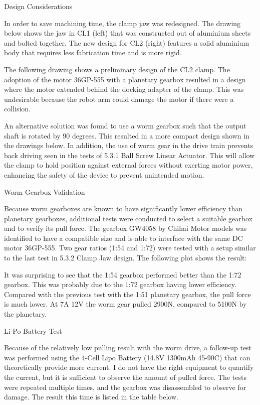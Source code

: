 Design Considerations

In order to save machining time, the clamp jaw was redesigned. The drawing below shows the jaw in CL1 (left) that was constructed out of aluminium sheets and bolted together. The new design for CL2 (right) features a solid aluminium body that requires less fabrication time and is more rigid. 

The following drawing shows a preliminary design of the CL2 clamp. The adoption of the motor 36GP-555 with a planetary gearbox resulted in a design where the motor extended behind the docking adapter of the clamp. This was undesirable because the robot arm could damage the motor if there were a collision. 

An alternative solution was found to use a worm gearbox such that the output shaft is rotated by 90 degrees. This resulted in a more compact design shown in the drawings below. In addition, the use of worm gear in the drive train prevents back driving seen in the tests of 5.3.1 Ball Screw Linear Actuator. This will allow the clamp to hold position against external forces without exerting motor power, enhancing the safety of the device to prevent unintended motion.

Worm Gearbox Validation

Because worm gearboxes are known to have significantly lower efficiency than planetary gearboxes, additional tests were conducted to select a suitable gearbox and to verify its pull force. The gearbox GW4058 by Chihai Motor models was identified to have a compatible size and is able to interface with the same DC motor 36GP-555. Two gear ratios (1:54 and 1:72) were tested with a setup similar to the last test in 5.3.2 Clamp Jaw design. The following plot shows the result:

It was surprising to see that the 1:54 gearbox performed better than the 1:72 gearbox. This was probably due to the 1:72 gearbox having lower efficiency. Compared with the previous test with the 1:51 planetary gearbox, the pull force is much lower. At 7A 12V the worm gear pulled 2900N, compared to 5100N by the planetary.

Li-Po Battery Test

Because of the relatively low pulling result with the worm drive, a follow-up test was performed using the 4-Cell Lipo Battery (14.8V 1300mAh 45-90C) that can theoretically provide more current. I do not have the right equipment to quantify the current, but it is sufficient to observe the amount of pulled force. The tests were repeated multiple times, and the gearbox was disassembled to observe for damage. The result this time is listed in the table below. 


